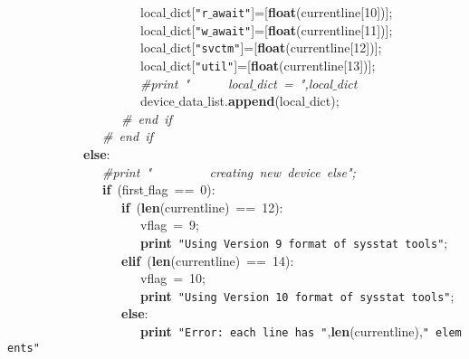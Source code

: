 \mbox{}\ \ \ \ \ \ \ \ \ \ \ \ \ \ \ \ \ \ \ \ \ local$\_$dict[\texttt{"{}r$\_$await"{}}]=[\textbf{float}(currentline[10])]; \\
\mbox{}\ \ \ \ \ \ \ \ \ \ \ \ \ \ \ \ \ \ \ \ \ local$\_$dict[\texttt{"{}w$\_$await"{}}]=[\textbf{float}(currentline[11])]; \\
\mbox{}\ \ \ \ \ \ \ \ \ \ \ \ \ \ \ \ \ \ \ \ \ local$\_$dict[\texttt{"{}svctm"{}}]=[\textbf{float}(currentline[12])]; \\
\mbox{}\ \ \ \ \ \ \ \ \ \ \ \ \ \ \ \ \ \ \ \ \ local$\_$dict[\texttt{"{}util"{}}]=[\textbf{float}(currentline[13])]; \\
\mbox{}\ \ \ \ \ \ \ \ \ \ \ \ \ \ \ \ \ \ \ \ \ \textit{\#print\ "{}\ \ \ \ \ \ local$\_$dict\ =\ "{},local$\_$dict} \\
\mbox{}\ \ \ \ \ \ \ \ \ \ \ \ \ \ \ \ \ \ \ \ \ device$\_$data$\_$list.\textbf{append}(local$\_$dict); \\
\mbox{}\ \ \ \ \ \ \ \ \ \ \ \ \ \ \ \ \ \ \textit{\#\ end\ if} \\
\mbox{}\ \ \ \ \ \ \ \ \ \ \ \ \ \ \ \textit{\#\ end\ if} \\
\mbox{}\ \ \ \ \ \ \ \ \ \ \ \ \textbf{else}: \\
\mbox{}\ \ \ \ \ \ \ \ \ \ \ \ \ \ \ \textit{\#print\ "{}\ \ \ \ \ \ \ \ \ creating\ new\ device\ else"{};} \\
\mbox{}\ \ \ \ \ \ \ \ \ \ \ \ \ \ \ \textbf{if}\ (first$\_$flag\ ==\ 0): \\
\mbox{}\ \ \ \ \ \ \ \ \ \ \ \ \ \ \ \ \ \ \textbf{if}\ (\textbf{len}(currentline)\ ==\ 12): \\
\mbox{}\ \ \ \ \ \ \ \ \ \ \ \ \ \ \ \ \ \ \ \ \ vflag\ =\ 9; \\
\mbox{}\ \ \ \ \ \ \ \ \ \ \ \ \ \ \ \ \ \ \ \ \ \textbf{print}\ \texttt{"{}Using\ Version\ 9\ format\ of\ sysstat\ tools"{}}; \\
\mbox{}\ \ \ \ \ \ \ \ \ \ \ \ \ \ \ \ \ \ \textbf{elif}\ (\textbf{len}(currentline)\ ==\ 14): \\
\mbox{}\ \ \ \ \ \ \ \ \ \ \ \ \ \ \ \ \ \ \ \ \ vflag\ =\ 10; \\
\mbox{}\ \ \ \ \ \ \ \ \ \ \ \ \ \ \ \ \ \ \ \ \ \textbf{print}\ \texttt{"{}Using\ Version\ 10\ format\ of\ sysstat\ tools"{}}; \\
\mbox{}\ \ \ \ \ \ \ \ \ \ \ \ \ \ \ \ \ \ \textbf{else}: \\
\mbox{}\ \ \ \ \ \ \ \ \ \ \ \ \ \ \ \ \ \ \ \ \ \textbf{print}\ \texttt{"{}Error:\ each\ line\ has\ "{}},\textbf{len}(currentline),\texttt{"{}\ elements"{}} \\
